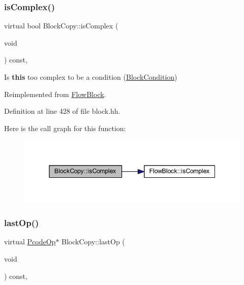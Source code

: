 \subsubsection{\texorpdfstring{isComplex()}{isComplex()}}
{\footnotesize\ttfamily virtual bool Block\+Copy\+::is\+Complex (\begin{DoxyParamCaption}\item[{void}]{ }\end{DoxyParamCaption}) const\hspace{0.3cm}{\ttfamily [inline]}, {\ttfamily [virtual]}}



Is {\bfseries{this}} too complex to be a condition (\mbox{\hyperlink{class_block_condition}{Block\+Condition}}) 



Reimplemented from \mbox{\hyperlink{class_flow_block_ad77905104bb4077b2d213c27b0582bf7}{Flow\+Block}}.



Definition at line 428 of file block.\+hh.

Here is the call graph for this function\+:
\nopagebreak
\begin{figure}[H]
\begin{center}
\leavevmode
\includegraphics[width=345pt]{class_block_copy_a3187e07356b398d20f12e36691522ced_cgraph}
\end{center}
\end{figure}
\mbox{\label{class_block_copy_ab07a0819d0e6527dd08240f09400c7d6}} 
\subsubsection{\texorpdfstring{lastOp()}{lastOp()}}
{\footnotesize\ttfamily virtual \mbox{\hyperlink{class_pcode_op}{Pcode\+Op}}$\ast$ Block\+Copy\+::last\+Op (\begin{DoxyParamCaption}\item[{void}]{ }\end{DoxyParamCaption}) const\hspace{0.3cm}{\ttfamily [inline]}, {\ttfamily [virtual]}}



